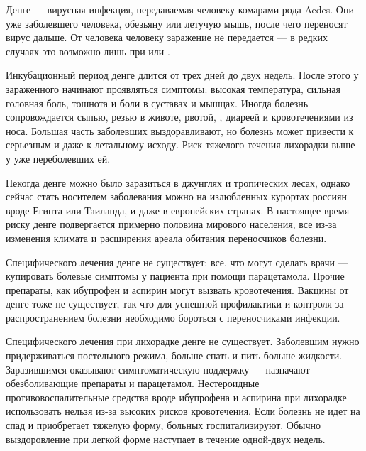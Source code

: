 Денге --- вирусная инфекция, передаваемая человеку комарами рода Aedes. Они  уже заболевшего человека, обезьяну или летучую мышь, после чего переносят вирус дальше. От человека человеку заражение не передается --- в редких случаях это возможно лишь при  или .

Инкубационный период денге длится от трех дней до двух недель. После этого у зараженного начинают проявляться симптомы: высокая температура, сильная головная боль, тошнота и боли в суставах и мышцах. Иногда болезнь сопровождается сыпью, резью в животе, рвотой, , диареей и кровотечениями из носа. Большая часть заболевших выздоравливают, но болезнь может привести к серьезным  и даже к летальному исходу. Риск тяжелого течения лихорадки выше у уже переболевших ей.

Некогда денге можно было заразиться в  джунглях и тропических лесах, однако сейчас стать носителем заболевания можно на излюбленных курортах россиян вроде Египта или Таиланда, и даже в европейских странах. В настоящее время риску денге подвергается примерно половина мирового населения, все из-за изменения климата и расширения ареала обитания переносчиков болезни.

Специфического лечения денге не существует: все, что могут сделать врачи --- купировать болевые симптомы у пациента при помощи парацетамола. Прочие препараты, как ибупрофен и аспирин могут вызвать кровотечения. Вакцины от денге тоже не существует, так что для успешной профилактики и контроля за распространением болезни необходимо бороться с переносчиками инфекции.

\begin{fancyquotes}
    Специфического лечения при лихорадке денге не существует. Заболевшим нужно придерживаться постельного режима, больше спать и пить больше жидкости. Заразившимся оказывают симптоматическую поддержку — назначают обезболивающие препараты и парацетамол. Нестероидные противовоспалительные средства вроде ибупрофена и аспирина при лихорадке использовать нельзя из-за высоких рисков кровотечения. Если болезнь не идет на спад и приобретает тяжелую форму, больных госпитализируют. Обычно выздоровление при легкой форме наступает в течение одной-двух недель.
\end{fancyquotes}

